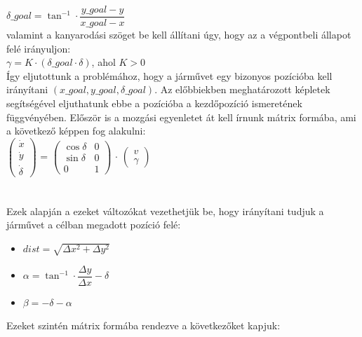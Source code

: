 $ \delta\_goal = \tan^{-1} \cdot \dfrac{y\_goal - y}{x\_goal - x} $\\

valamint a kanyarodási szöget be kell állítani úgy, hogy az a végpontbeli állapot felé irányuljon:\\

$ \gamma = K \cdot ( \delta\_goal \cdot \delta ) $, \qquad ahol $ K > 0 $\\

Így eljutottunk a problémához, hogy a járművet egy bizonyos pozícióba kell irányítani $ (x\_goal, y\_goal, \delta\_goal) $. Az előbbiekben meghatározott képletek segítségével eljuthatunk ebbe a pozícióba a kezdőpozíció ismeretének függvényében. Először is a mozgási egyenletet át kell írnunk mátrix formába, ami a következő képpen fog alakulni:\\

\( \begin{pmatrix}
	\dot{x}\\
	\dot{y}\\
	\dot{\delta}
\end{pmatrix} \)
=
\( \begin{pmatrix}
	\cos\delta & 0\\
	\sin\delta & 0\\
	0 & 1
\end{pmatrix} \)
$ \cdot $ 
\( \begin{pmatrix}
	v\\
	\gamma
\end{pmatrix} \)
\\\\\\
Ezek alapján a ezeket változókat vezethetjük be, hogy irányítani tudjuk a járművet a célban megadott pozíció felé:
\begin{itemize}
	\item[] $ dist = \sqrt{\Delta x^2 + \Delta y^2} $
	\item[] $ \alpha = \tan^{-1} \cdot \dfrac{\Delta y}{\Delta x} - \delta $
	\item[] $ \beta = -\delta - \alpha $
\end{itemize}
 
Ezeket szintén mátrix formába rendezve a következőket kapjuk:\\

